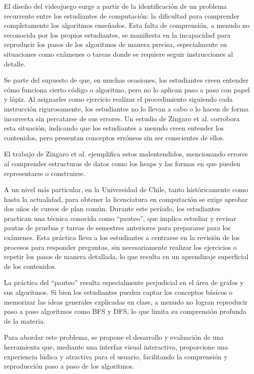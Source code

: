 El diseño del videojuego surge a partir de la identificación de un problema recurrente entre los estudiantes de computación: la dificultad para comprender completamente los algoritmos enseñados. Esta falta de comprensión, a menudo no reconocida por los propios estudiantes, se manifiesta en la incapacidad para reproducir los pasos de los algoritmos de manera precisa, especialmente en situaciones como exámenes o tareas donde se requiere seguir instrucciones al detalle.

Se parte del supuesto de que, en muchas ocasiones, los estudiantes creen entender cómo funciona cierto código o algoritmo, pero no lo aplican paso a paso con papel y lápiz. Al asignarles como ejercicio realizar el procedimiento siguiendo cada instrucción rigurosamente, los estudiantes no lo llevan a cabo o lo hacen de forma incorrecta sin percatarse de sus errores. Un estudio de Zingaro et al. \cite{IdentifyingStudentDifficultiesDataStructures} corrobora esta situación, indicando que los estudiantes a menudo creen entender los contenidos, pero presentan conceptos erróneos sin ser conscientes de ellos.

El trabajo de Zingaro et al. \cite{IdentifyingStudentDifficultiesDataStructures} ejemplifica estos malentendidos, mencionando errores al comprender estructuras de datos como los heaps y las formas en que pueden representarse o construirse.

A un nivel más particular, en la Universidad de Chile, tanto históricamente como hasta la actualidad, para obtener la licenciatura en computación se exige aprobar dos años de cursos de plan común. Durante este período, los estudiantes practican una técnica conocida como ``pauteo'', que implica estudiar y revisar pautas de pruebas y tareas de semestres anteriores para prepararse para los exámenes. Esta práctica lleva a los estudiantes a centrarse en la revisión de los procesos para responder preguntas, sin necesariamente realizar los ejercicios o repetir los pasos de manera detallada, lo que resulta en un aprendizaje superficial de los contenidos.

La práctica del ``pauteo'' resulta especialmente perjudicial en el área de grafos y sus algoritmos. Si bien los estudiantes pueden captar los conceptos básicos o memorizar las ideas generales explicadas en clase, a menudo no logran reproducir paso a paso algoritmos como BFS y DFS, lo que limita su comprensión profunda de la materia.

Para abordar este problema, se propone el desarrollo y evaluación de una herramienta que, mediante una interfaz visual interactiva, proporcione una experiencia lúdica y atractiva para el usuario, facilitando la comprensión y reproducción paso a paso de los algoritmos.

